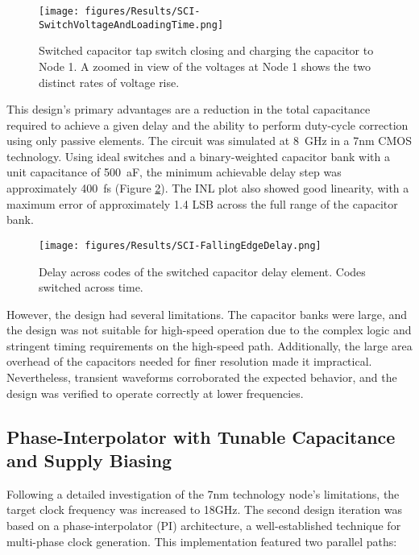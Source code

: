 \begin{figure}[h]
  \centering
  \texttt{[image: figures/Results/SCI-SwitchVoltageAndLoadingTime.png]}
  \caption{Switched capacitor tap switch closing and charging the capacitor to Node 1. A zoomed in view of the voltages at Node 1 shows the two distinct rates of voltage rise.}
  \label{fig:switched_cap_charging_cap_switch}
\end{figure}

This design's primary advantages are a reduction in the total capacitance required to achieve a given delay and the ability to perform duty-cycle correction using only passive elements. The circuit was simulated at \SI{8}{\giga\hertz} in a 7nm CMOS technology. Using ideal switches and a binary-weighted capacitor bank with a unit capacitance of \SI{500}{\atto\farad}, the minimum achievable delay step was approximately \SI{400}{\femto\second} (Figure \ref{fig:SCI_delayacrosscodes}). The INL plot also showed good linearity, with a maximum error of approximately 1.4 LSB across the full range of the capacitor bank.

\begin{figure}[h]
  \centering
  \texttt{[image: figures/Results/SCI-FallingEdgeDelay.png]}
  \caption{Delay across codes of the switched capacitor delay element. Codes switched across time.}
  \label{fig:SCI_delayacrosscodes}
\end{figure}

However, the design had several limitations. The capacitor banks were large, and the design was not suitable for high-speed operation due to the complex logic and stringent timing requirements on the high-speed path. Additionally, the large area overhead of the capacitors needed for finer resolution made it impractical. Nevertheless, transient waveforms corroborated the expected behavior, and the design was verified to operate correctly at lower frequencies.

\subsection{Phase‑Interpolator with Tunable Capacitance and Supply Biasing}\label{sec:pi_cap_supply}

Following a detailed investigation of the 7nm technology node's limitations, the target clock frequency was increased to 18GHz. The second design iteration was based on a phase-interpolator (PI) architecture, a well-established technique for multi-phase clock generation. This implementation featured two parallel paths:

